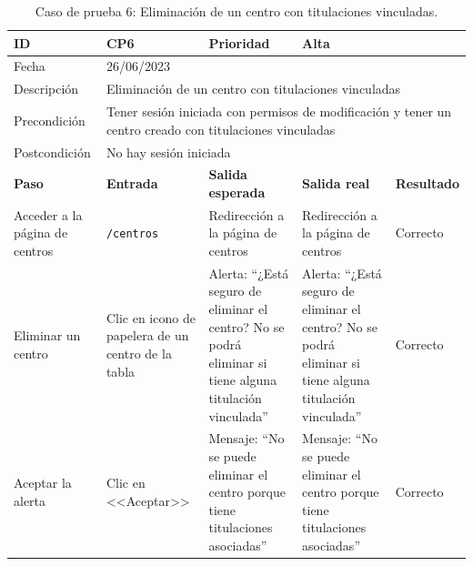 \begin{table}[H]
\begin{tabular}{p{} p{} p{} p{} p{}}
\cellcolor{gray!25}
ID   & CP6 & \cellcolor{gray!25} Prioridad   & Alta \\ \hline
\cellcolor{gray!25} Fecha	&	\multicolumn{4}{l}{26/06/2023} \\ \hline
\cellcolor{gray!25} Descripción		&	\multicolumn{4}{l}{Eliminación de un centro con titulaciones vinculadas} \\ \hline                                            
\cellcolor{gray!25}
Precondición  & \multicolumn{4}{p{.66\textwidth}}{Tener sesión iniciada con permisos de modificación y tener un centro creado con titulaciones vinculadas} \\ \hline
\cellcolor{gray!25} Postcondición & \multicolumn{4}{l}{No hay sesión iniciada}                                                    \\ \hline
\rowcolor{gray!25}
\textbf{Paso}   & \textbf{Entrada} & \textbf{Salida esperada} & \textbf{Salida real} & \textbf{Resultado} \\ \hline
Acceder a la página de centros 
& \texttt{/centros}                                                                             
& Redirección a la página de centros                                   
& Redirección a la página de centros                                   
& Correcto                            
\\ \hline
Eliminar un centro
& Clic en icono de papelera de un centro de la tabla
& Alerta: ``¿Está seguro de eliminar el centro? No se podrá eliminar si tiene alguna titulación vinculada''
& Alerta: ``¿Está seguro de eliminar el centro? No se podrá eliminar si tiene alguna titulación vinculada''                              
& Correcto
\\ \hline
Aceptar la alerta
& Clic en <<Aceptar>>
& Mensaje: ``No se puede eliminar el centro porque tiene titulaciones asociadas''                              
& Mensaje: ``No se puede eliminar el centro porque tiene titulaciones asociadas''                             
& Correcto                            
\\ \hline                
\end{tabular}
\caption{Caso de prueba 6: Eliminación de un centro con titulaciones vinculadas.}
\end{table}

